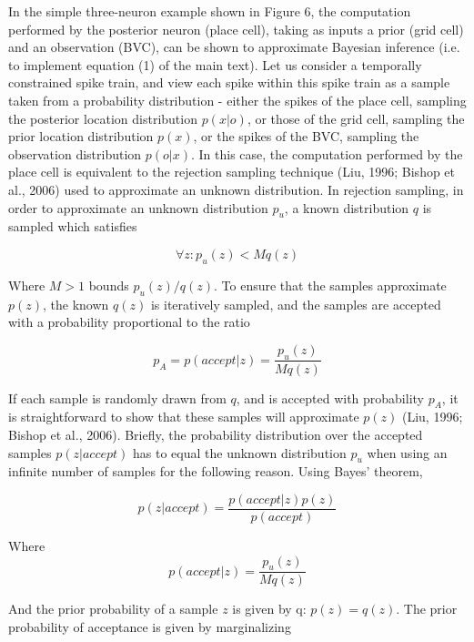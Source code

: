 In the simple three-neuron example shown in Figure 6, the computation performed by the posterior neuron (place cell), taking as inputs a prior (grid cell) and an observation (BVC), can be shown to approximate Bayesian inference (i.e. to implement equation (1) of the main text). Let us consider a temporally constrained spike train, and view each spike within this spike train as a sample taken from a probability distribution - either the spikes of the place cell, sampling the posterior location distribution $ p(x|o) $, or those of the grid cell, sampling the prior location distribution $ p(x) $, or the spikes of the BVC, sampling the observation distribution $ p(o|x) $.
In this case, the computation performed by the place cell is equivalent to the rejection sampling technique (Liu, 1996; Bishop et al., 2006) used to approximate an unknown distribution. In rejection sampling, in order to approximate an unknown distribution $p_u$, a known distribution $q$ is sampled which satisfies 

\begin{equation}\label{RejSamp}
\forall z : p_u(z) < Mq(z)
\end{equation}

Where $M>1$ bounds $p_u(z)/q(z)$. To ensure that the samples approximate $p(z)$, the known $q(z)$ is iteratively sampled, and the samples are accepted with a probability proportional to the ratio 

\begin{equation}\label{AccProb}
p_A=p(accept|z)=\frac{p_u(z)}{Mq(z)}
\end{equation}

If each sample is randomly drawn from $q$, and is accepted with probability $p_A$, it is straightforward to show that these samples will approximate $p(z)$ (Liu, 1996; Bishop et al., 2006). Briefly, the probability distribution over the accepted samples $ p(z|accept) $ has to equal the unknown distribution $p_u$ when using an infinite number of samples for the following reason. Using Bayes' theorem,

\begin{equation}\label{RSProof1}
p(z|accept)=\frac{p(accept|z) p(z)}{p(accept)} 
\end{equation}

Where
\begin{equation}\label{RSProof2}
p(accept|z)=\frac{p_u(z)}{Mq(z)}
\end{equation}

And the prior probability of a sample $z$ is given by q: $p(z)=q(z)$. The prior probability of acceptance is given by marginalizing


